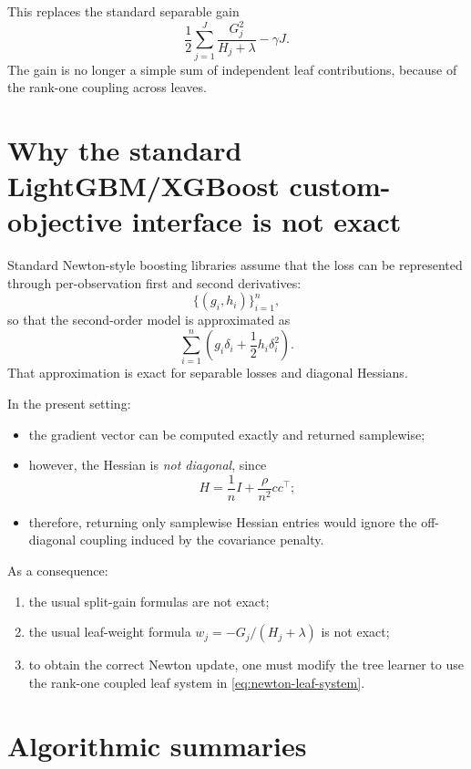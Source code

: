 \documentclass[11pt]{article}
\newcommand{\1}{\mathbf{1}}
\begin{document}
This replaces the standard separable gain
\[
\frac{1}{2}\sum_{j=1}^J \frac{G_j^2}{H_j+\lambda} - \gamma J.
\]
The gain is no longer a simple sum of independent leaf contributions, because of the rank-one coupling across leaves.

\section{Why the standard LightGBM/XGBoost custom-objective interface is not exact}

Standard Newton-style boosting libraries assume that the loss can be represented through per-observation first and second derivatives:
\[
\{(g_i,h_i)\}_{i=1}^n,
\]
so that the second-order model is approximated as
\[
\sum_{i=1}^n \left(g_i \delta_i + \frac{1}{2}h_i \delta_i^2\right).
\]
That approximation is exact for separable losses and diagonal Hessians.

In the present setting:
\begin{itemize}[leftmargin=2em]
\item the gradient vector can be computed exactly and returned samplewise;
\item however, the Hessian is \emph{not diagonal}, since
\[
H = \frac{1}{n}I + \frac{\rho}{n^2}cc^\top;
\]
\item therefore, returning only samplewise Hessian entries would ignore the off-diagonal coupling induced by the covariance penalty.
\end{itemize}

As a consequence:
\begin{enumerate}[leftmargin=2em]
\item the usual split-gain formulas are not exact;
\item the usual leaf-weight formula $w_j = -G_j/(H_j+\lambda)$ is not exact;
\item to obtain the correct Newton update, one must modify the tree learner to use the rank-one coupled leaf system in \eqref{eq:newton-leaf-system}.
\end{enumerate}

\section{Algorithmic summaries}
\end{document}

